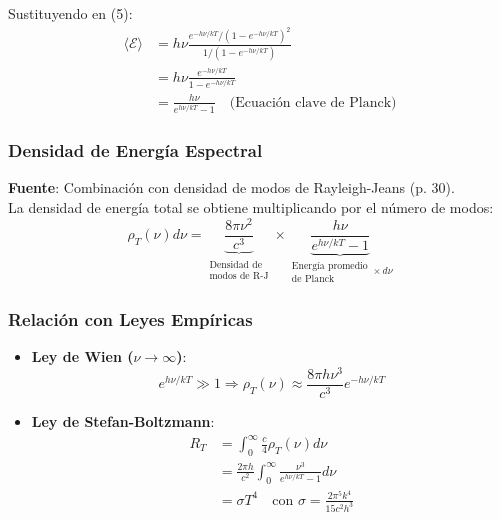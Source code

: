 \documentclass{article}
\begin{document}
	Sustituyendo en (5):
	\begin{align}
		\langle \mathcal{E} \rangle &= h\nu \frac{e^{-h\nu/kT}/(1 - e^{-h\nu/kT})^2}{1/(1 - e^{-h\nu/kT})} \nonumber \\
		&= h\nu \frac{e^{-h\nu/kT}}{1 - e^{-h\nu/kT}} \nonumber \\
		&= \frac{h\nu}{e^{h\nu/kT} - 1} \quad \text{(Ecuación clave de Planck)}
	\end{align}
	
	\subsubsection*{Densidad de Energía Espectral}
	\textbf{Fuente}: Combinación con densidad de modos de Rayleigh-Jeans (p. 30).\\
	La densidad de energía total se obtiene multiplicando por el número de modos:
	\begin{equation}
		\rho_T(\nu)d\nu = \underbrace{\frac{8\pi \nu^2}{c^3}}_{\substack{\text{Densidad de} \\ \text{modos de R-J}}} \times \underbrace{\frac{h\nu}{e^{h\nu/kT} - 1}}_{\substack{\text{Energía promedio} \\ \text{de Planck}} \times d\nu}
	\end{equation}
	
	\subsubsection*{Relación con Leyes Empíricas}
	\begin{itemize}
		\item \textbf{Ley de Wien (\(\nu \to \infty\))}: 
		\begin{equation}
			e^{h\nu/kT} \gg 1 \Rightarrow \rho_T(\nu) \approx \frac{8\pi h\nu^3}{c^3}e^{-h\nu/kT}
		\end{equation}
		
		\item \textbf{Ley de Stefan-Boltzmann}:
		\begin{align}
			R_T &= \int_0^\infty \frac{c}{4}\rho_T(\nu)d\nu \nonumber \\
			&= \frac{2\pi h}{c^2} \int_0^\infty \frac{\nu^3}{e^{h\nu/kT} - 1}d\nu \nonumber \\
			&= \sigma T^4 \quad \text{con } \sigma = \frac{2\pi^5 k^4}{15c^2 h^3}
		\end{align}
	\end{itemize}
	
\end{document}
